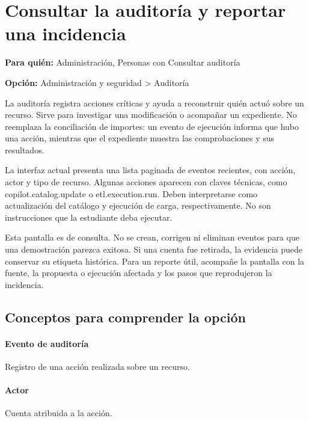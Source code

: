 \begingroup
\setlength{\parskip}{4pt plus 1pt minus 1pt}
\titlespacing*{\paragraph}{0pt}{4pt}{0.5em}
\section{Consultar la auditoría y reportar una incidencia}
\label{unidad:operacion_08}
\textbf{Para quién:} Administración, Personas con Consultar auditoría\par
\textbf{Opción:} Administración y seguridad > Auditoría\par

La auditoría registra acciones críticas y ayuda a reconstruir quién actuó sobre un recurso. Sirve para investigar una modificación o acompañar un expediente. No reemplaza la conciliación de importes: un evento de ejecución informa que hubo una acción, mientras que el expediente muestra las comprobaciones y sus resultados.

La interfaz actual presenta una lista paginada de eventos recientes, con acción, actor y tipo de recurso. Algunas acciones aparecen con claves técnicas, como copilot.catalog.update o etl.execution.run. Deben interpretarse como actualización del catálogo y ejecución de carga, respectivamente. No son instrucciones que la estudiante deba ejecutar.

Esta pantalla es de consulta. No se crean, corrigen ni eliminan eventos para que una demostración parezca exitosa. Si una cuenta fue retirada, la evidencia puede conservar su etiqueta histórica. Para un reporte útil, acompañe la pantalla con la fuente, la propuesta o ejecución afectada y los pasos que reprodujeron la incidencia.

\subsection{Conceptos para comprender la opción}
\paragraph{Evento de auditoría} Registro de una acción realizada sobre un recurso.

\paragraph{Actor} Cuenta atribuida a la acción.

